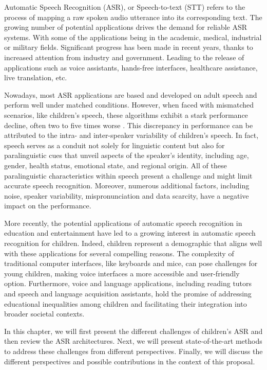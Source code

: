 \label{chap:Chapter2}
\cleardoublepage
Automatic Speech Recognition (ASR), or Speech-to-text (STT) refers to the process of mapping a raw spoken audio utterance into its corresponding text. The growing number of potential applications drives the demand for reliable ASR systems. With some of the applications being in the academic, medical, industrial or military fields. Significant progress has been made in recent years, thanks to increased attention from industry and government. Leading to the release of applications such as voice assistants, hands-free interfaces, healthcare assistance, live translation, etc.

Nowadays, most ASR applications are based and developed on adult speech and perform well under matched conditions.
However, when faced with mismatched scenarios, like children's speech, these algorithms exhibit a stark performance decline, often two to five times worse \cite{childrenSpeechWorse}. This discrepancy in performance can be attributed to the intra- and inter-speaker variability of children's speech. In fact, speech serves as a conduit not solely for linguistic content but also for paralinguistic cues that unveil aspects of the speaker's identity, including age, gender, health status, emotional state, and regional origin. All of these paralinguistic characteristics within speech present a challenge and might limit accurate speech recognition. Moreover, numerous additional factors, including noise, speaker variability, mispronunciation and data scarcity, have a negative impact on the performance.


More recently, the potential applications of automatic speech recognition in education and entertainment have led to a growing interest in automatic speech recognition for children. Indeed, children represent a demographic that aligns well with these applications for several compelling reasons. The complexity of traditional computer interfaces, like keyboards and mice, can pose challenges for young children, making voice interfaces a more accessible and user-friendly option. Furthermore, voice and language applications, including reading tutors and speech and language acquisition assistants, hold the promise of addressing educational inequalities among children and facilitating their integration into broader societal contexts.

In this chapter, we will first present the different challenges of children's ASR and then review the ASR architectures. Next, we will present state-of-the-art methods to address these challenges from different perspectives. Finally, we will discuss the different perspectives and possible contributions in the context of this proposal. 
